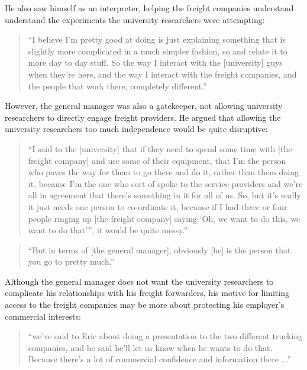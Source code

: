 He also saw himself as an interpreter, helping the freight companies understand understand the experiments the university researchers were attempting: 

\begin{quote}
\small
\enquote{I believe I'm pretty good at doing is just explaining something that is slightly more complicated in a much simpler fashion, so and relate it to more day to day stuff. So the way I interact with the [university] guys when they're here, and the way I interact with the freight companies, and the people that work there, completely different.} \\
\end{quote}

However, the general manager was also a gatekeeper, not allowing university researchers to directly engage freight providers. He argued that allowing the university researchers too much independence would be quite disruptive: 

\begin{quote}
\small
\enquote{I said to the [university] that if they need to spend some time with [the freight company] and use some of their equipment, that I'm the person who paves the way for them to go there and do it, rather than them doing it, because I'm the one who sort of spoke to the service providers and we’re all in agreement that there's something in it for all of us. So, but it's really it just needs one person to co-ordinate it, because if I had three or four people ringing up [the freight company] saying \enquote{Oh, we want to do this, we want to do that}”, it would be quite messy.} \\
\end{quote}

\begin{quote}
\small
\enquote{But in terms of [the general manager], obviously [he] is the person that you go to pretty much.} \\
\end{quote}

Although the general manager does not want the university researchers to complicate his relationships with his freight forwarders, his motive for limiting access to the freight companies may be more about protecting his employer's commercial interests:

\begin{quote}
\small
\enquote{we've said to Eric about doing a presentation to the two different trucking companies, and he said he'll let us know when he wants to do that. Because there’s a lot of commercial confidence and information there ...} \\
\end{quote}

